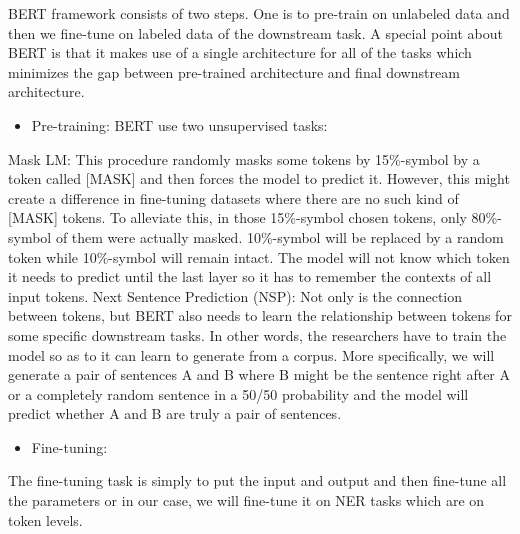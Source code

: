 \documentclass[conference]{IEEEtran}
\begin{document}
\noindent BERT framework consists of two steps. One is to pre-train on unlabeled data and then 
we fine-tune on labeled data of the downstream task. A special point about BERT is that it makes 
use of a single architecture for all of the tasks which minimizes the gap between 
pre-trained architecture and final downstream architecture.

\begin{itemize}
    \item Pre-training: BERT use two unsupervised tasks: 
\end{itemize}
\noindent Mask LM: This procedure randomly masks some tokens by 15\%-symbol by a token called 
[MASK] and then forces the model to predict it. However, this might create a difference in 
fine-tuning datasets where there are no such kind of [MASK] tokens. To alleviate this, in 
those 15\%-symbol chosen tokens, only 80\%-symbol of them were actually masked. 10\%-symbol 
will be replaced by a random token while 10\%-symbol will remain intact. The model will 
not know which token it needs to predict until the last layer so it has to remember the 
contexts of all input tokens.
\noindent Next Sentence Prediction (NSP): Not only is the connection between tokens, 
but BERT also needs to learn the relationship between tokens for some specific downstream tasks. 
In other words, the researchers have to train the model so as to it can learn to generate 
from a corpus. More specifically, we will generate a pair of sentences A and B where B might 
be the sentence right after A or a completely random sentence in a 50/50 probability and 
the model will predict whether A and B are truly a pair of sentences.

\begin{itemize}
    \item Fine-tuning:
\end{itemize}
\noindent The fine-tuning task is simply to put the input and output and then fine-tune all 
the parameters or in our case, we will fine-tune it on NER tasks which are on token levels. 
\vspace{3mm}
\end{document}
